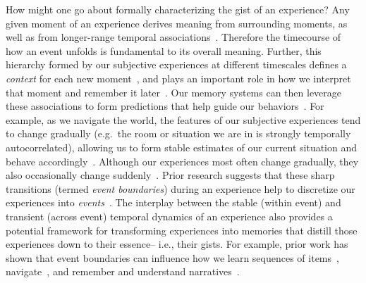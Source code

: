 \documentclass{article}
\begin{document}
How might one go about formally characterizing the gist of an experience?  Any given moment of an experience derives meaning from surrounding moments, as well as from longer-range temporal associations~\citep[e.g., ][]{LernEtal11}.  Therefore the timecourse of how an event unfolds is fundamental to its overall meaning.  Further, this hierarchy formed by our subjective experiences at different timescales defines a \textit{context} for each new moment~\citep[e.g., ][]{HowaKaha02, HowaEtal14}, and plays an important role in how we interpret that moment and remember it later~\citep[for review see][]{MannEtal15}.  Our memory systems can then leverage these associations to form predictions that help guide our behaviors~\citep{RangRitc12}.  For example, as we navigate the world, the features of our subjective experiences tend to change gradually (e.g.\ the room or situation we are in is strongly temporally autocorrelated), allowing us to form stable estimates of our current situation and behave accordingly~\citep{ZackEtal07, ZwaaRadv98}.  Although our experiences most often change gradually, they also occasionally change suddenly~\citep[e.g., when we walk through a doorway; ][]{RadvZack17}.  Prior research suggests that these sharp transitions (termed \textit{event boundaries}) during an experience help to discretize our experiences into \textit{events}~\citep{RadvZack17, BrunEtal18, HeusEtal18, ClewDava17, EzzyDava11, DuBrDava13}.  The interplay between the stable (within event) and transient (across event) temporal dynamics of an experience also provides a potential framework for transforming experiences into memories that distill those experiences down to their essence-- i.e., their gists.  For example, prior work has shown that event boundaries can influence how we learn sequences of items~\citep{HeusEtal18, DuBrDava13}, navigate~\citep{BrunEtal18}, and remember and understand narratives~\citep{ZwaaRadv98, EzzyDava11}.
\end{document}

